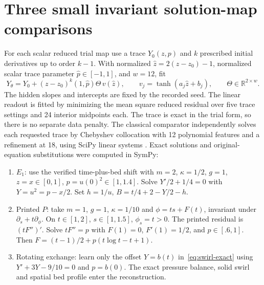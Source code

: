 \documentclass[12pt,a4paper,oneside]{report}
\numberwithin{equation}{chapter}
\theoremstyle{remark}\newtheorem{remark}[theorem]{Remark}
\begin{document}
\section{Three small invariant solution-map comparisons}\label{sec:comparison}
\newcommand{\EulerNeuralRms}{1.06\times 10^{-5}}
\newcommand{\EulerNeuralMax}{3.26\times 10^{-5}}
\newcommand{\EulerNeuralRes}{1.42\times 10^{-3}}
\newcommand{\EulerChebRms}{0.00\times 10^{0}}
\newcommand{\EulerChebMax}{0.00\times 10^{0}}
\newcommand{\EulerChebRes}{0.00\times 10^{0}}
\newcommand{\PrintedNeuralRms}{9.48\times 10^{-6}}
\newcommand{\PrintedNeuralMax}{2.02\times 10^{-5}}
\newcommand{\PrintedNeuralRes}{2.24\times 10^{-2}}
\newcommand{\PrintedChebRms}{2.28\times 10^{-12}}
\newcommand{\PrintedChebMax}{4.42\times 10^{-12}}
\newcommand{\PrintedChebRes}{1.24\times 10^{-9}}
\newcommand{\BasinNeuralRms}{1.05\times 10^{-5}}
\newcommand{\BasinNeuralMax}{4.07\times 10^{-5}}
\newcommand{\BasinNeuralRes}{3.47\times 10^{-3}}
\newcommand{\BasinChebRms}{2.60\times 10^{-13}}
\newcommand{\BasinChebMax}{8.02\times 10^{-13}}
\newcommand{\BasinChebRes}{1.91\times 10^{-11}}
For each scalar reduced trial map use a trace $Y_0(z,p)$ and $k$ prescribed initial derivatives up to order $k-1$. With normalized $\widehat z=2(z-z_0)-1$, normalized scalar trace parameter $\widehat p\in[-1,1]$, and $w=12$, fit
\[
 Y_\theta=Y_0+(z-z_0)^k(1,\widehat p)\Theta\,v(\widehat z),
 \qquad v_j=\tanh(a_j\widehat z+b_j),\qquad \Theta\in\mathbb R^{2\times w}.
\]
The hidden slopes and intercepts are fixed by the recorded seed. The linear readout is fitted by minimizing the mean square reduced residual over five trace settings and 24 interior midpoints each. The trace is exact in the trial form, so there is no separate data penalty. The classical comparator independently solves each requested trace by Chebyshev collocation with 12 polynomial features and a refinement at 18, using SciPy linear systems \cite{trefethen}. Exact solutions and original-equation substitutions were computed in SymPy:
\begin{enumerate}
 \item $E_1$: use the verified time-plus-bed shift with $m=2$, $\kappa=1/2$, $g=1$, $z=x\in[0,1]$, $p=u(0)^2\in[1,1.4]$. Solve $Y'/2+1/4=0$ with $Y=u^2=p-x/2$. Set $h=1/u$, $B=t/4+2-Y/2-h$.
 \item Printed $P$: take $m=1$, $g=1$, $\kappa=1/10$ and $\phi=ts+F(t)$, invariant under $\partial_s+t\partial_\phi$. On $t\in[1,2]$, $s\in[1,1.5]$, $\phi_s=t>0$. The printed residual is $(tF'')'$. Solve $tF''=p$ with $F(1)=0$, $F'(1)=1/2$, and $p\in[.6,1]$. Then $F=(t-1)/2+p(t\log t-t+1)$.
 \item Rotating exchange: learn only the offset $Y=b(t)$ in~\eqref{eq:swirl-exact} using $Y'+3Y-9/10=0$ and $p=b(0)$. The exact pressure balance, solid swirl and spatial bed profile enter the reconstruction.
\end{enumerate}
\end{document}
